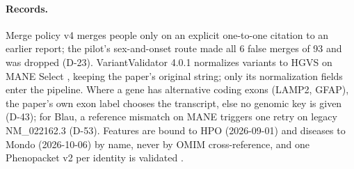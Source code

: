 \documentclass{article} %
\begin{document}
\paragraph{Records.} Merge policy v4 merges people only on an explicit one-to-one citation to an earlier report; the pilot's sex-and-onset route made all 6 false merges of 93 and was dropped (D-23). VariantValidator 4.0.1 \citep{freeman2018_variantvalidator} normalizes variants to HGVS \citep{hart2024_hgvs2024} on MANE Select \citep{morales2022_mane}, keeping the paper's original string; only its normalization fields enter the pipeline. Where a gene has alternative coding exons (LAMP2, GFAP), the paper's own exon label chooses the transcript, else no genomic key is given (D-43); for Blau, a reference mismatch on MANE triggers one retry on legacy NM\_022162.3 (D-53). Features are bound to HPO (2026-09-01) and diseases to Mondo (2026-10-06) by name, never by OMIM cross-reference, and one Phenopacket v2 \citep{jacobsen2022_phenopacket_schema} per identity is validated \citep{danis2023_phenopacket_tools}.
\end{document}

